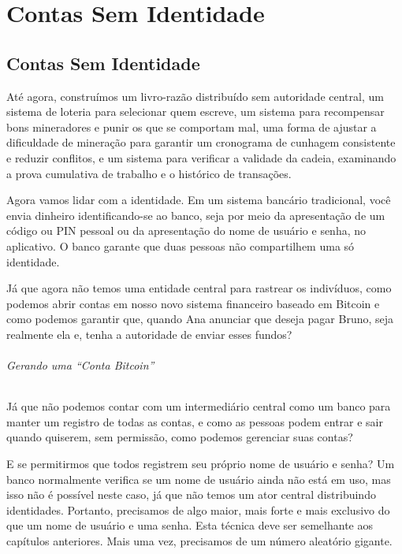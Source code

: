 \part{Contas Sem Identidade}
\label{ch:capitulo7}
\chapter*{Contas Sem Identidade}

Até agora, construímos um livro-razão distribuído sem autoridade central, um sistema de loteria para selecionar quem escreve, um sistema para recompensar bons mineradores e punir os que se comportam mal, uma forma de ajustar a dificuldade de mineração para garantir um cronograma de cunhagem consistente e reduzir conflitos, e um sistema para verificar a validade da cadeia, examinando a prova cumulativa de trabalho e o histórico de transações.

Agora vamos lidar com a identidade. Em um sistema bancário tradicional, você envia dinheiro identificando-se ao banco, seja por meio da apresentação de um código ou PIN pessoal ou da apresentação do nome de usuário e senha, no aplicativo. O banco garante que duas pessoas não compartilhem uma só identidade.

Já que agora não temos uma entidade central para rastrear os indivíduos, como podemos abrir contas em nosso novo sistema financeiro baseado em Bitcoin e como podemos garantir que, quando Ana anunciar que deseja pagar Bruno, seja realmente ela e, tenha a autoridade de enviar esses fundos?

\paragraph{Gerando uma “Conta Bitcoin”}
\paragraph{}

Já que não podemos contar com um intermediário central como um banco para manter um registro de todas as contas, e como as pessoas podem entrar e sair quando quiserem, sem permissão, como podemos gerenciar suas contas?

E se permitirmos que todos registrem seu próprio nome de usuário e senha? Um banco normalmente verifica se um nome de usuário ainda não está em uso, mas isso não é possível neste caso, já que não temos um ator central distribuindo identidades. Portanto, precisamos de algo maior, mais forte e mais exclusivo do que um nome de usuário e uma senha. Esta técnica deve ser semelhante aos capítulos anteriores. Mais uma vez, precisamos de um número aleatório gigante.

